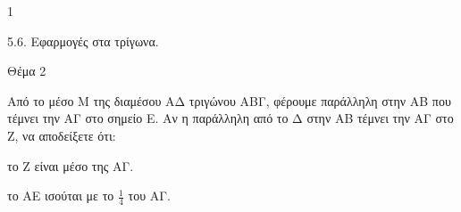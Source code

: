 \begin{ylh}{1}
    \item 5.6. Εφαρμογές στα τρίγωνα.
\end{ylh}

Θέμα 2

Από το μέσο Μ της διαμέσου ΑΔ τριγώνου ΑΒΓ, φέρουμε παράλληλη στην ΑΒ που τέμνει την ΑΓ στο σημείο Ε. Αν η παράλληλη από το Δ στην ΑΒ τέμνει την ΑΓ στο Ζ, να αποδείξετε ότι:

\begin{alist}
\item το Ζ είναι μέσο της ΑΓ. 

\item το ΑΕ ισούται με το $\frac{1}{4}$ του ΑΓ. 
\end{alist}
